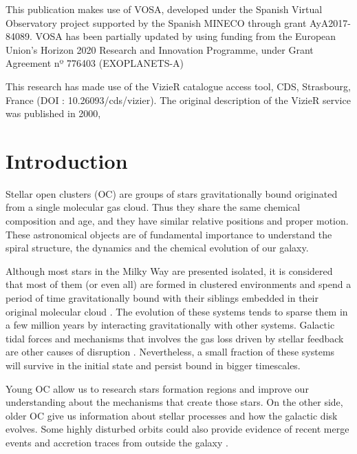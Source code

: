 \documentclass[11pt, a4paper, english]{book}
\begin{document}
\medskip

This publication makes use of VOSA, developed under the Spanish Virtual Observatory project
supported by the Spanish MINECO through grant AyA2017-84089.
VOSA has been partially updated by using funding from the European Union's Horizon 2020 Research
and Innovation Programme, under Grant Agreement nº 776403 (EXOPLANETS-A)

\medskip

This research has made use of the VizieR catalogue access tool, CDS, Strasbourg, France (DOI : 10.26093/cds/vizier).
The original description of the VizieR service was published in 2000, \cite[A\&AS 143, 23]{ochsenbein2000vizier}

\mainmatter
\chapter{Introduction}

Stellar open clusters (OC) \cite{janes1982open} are groups of stars gravitationally bound originated from a single molecular gas cloud.
Thus they share the same chemical composition and age, and they have similar relative positions and proper motion.
These astronomical objects are of fundamental importance to understand the spiral structure,
the dynamics and the chemical evolution of our galaxy.

Although most stars in the Milky Way are presented isolated, it is considered that most of them (or even all)
are formed in clustered environments and spend a period of time gravitationally bound with their siblings embedded
in their original molecular cloud
\cite{clarke2000theformationofstellarclusters} \cite{portegies2010young}.
The evolution of these systems tends to sparse them in a few million years by interacting gravitationally with other systems.
Galactic tidal forces and mechanisms that involves the gas loss driven by stellar feedback are other causes of disruption
\cite{brinkmann2017bound}.
Nevertheless, a small fraction of these systems will survive in the initial state and persist bound in bigger timescales.

Young OC allow us to research stars formation regions and improve our understanding about the mechanisms that create those stars.
On the other side, older OC give us information about stellar processes and how the galactic disk evolves.
Some highly disturbed orbits could also provide evidence of recent merge events and accretion traces from outside the galaxy
\cite{cantat2016abundances}.
\end{document}
